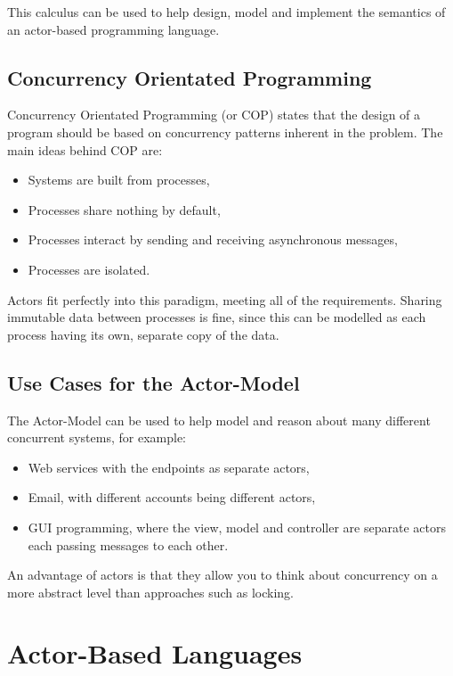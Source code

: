 \documentclass[pdftex,11pt,a4paper]{report}
\begin{document}
This calculus can be used to help design, model and implement the semantics of an actor-based programming language.

\subsection{Concurrency Orientated Programming}
Concurrency Orientated Programming\cite{armstrong2007} (or COP) states that the design of a program should be based on concurrency patterns inherent in the problem.
The main ideas behind COP are:
\begin{itemize}
\item Systems are built from processes,
\item Processes share nothing by default,
\item Processes interact by sending and receiving asynchronous messages,
\item Processes are isolated.
\end{itemize}

Actors fit perfectly into this paradigm, meeting all of the requirements.
Sharing immutable data between processes is fine, since this can be modelled as each process having its own, separate copy of the data.

\subsection{Use Cases for the Actor-Model}

The Actor-Model can be used to help model and reason about many different concurrent systems, for example:

\begin{itemize}[noitemsep]
\item Web services with the endpoints as separate actors,
\item Email, with different accounts being different actors,
\item GUI programming, where the view, model and controller are separate actors 	 each passing messages to each other.
\end{itemize}

An advantage of actors is that they allow you to think about concurrency on a more abstract level than approaches such as locking.

\newpage
\section{Actor-Based Languages}
\end{document}
